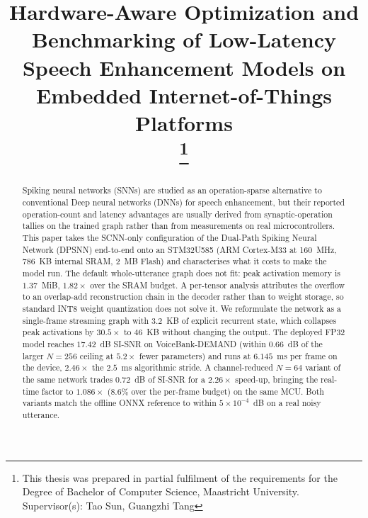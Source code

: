 \documentclass[conference]{IEEEtran}
\begin{document}
\title{Hardware-Aware Optimization and Benchmarking of Low-Latency Speech Enhancement Models on Embedded Internet-of-Things Platforms\\
\thanks{This thesis was prepared in partial fulfilment of the requirements for the Degree of Bachelor of Computer Science, Maastricht University. Supervisor(s): Tao Sun, Guangzhi Tang}
}

\author{
}

\maketitle

\begin{abstract}
Spiking neural networks (SNNs) are studied as an operation-sparse alternative to conventional Deep neural networks (DNNs) for speech enhancement, but their reported operation-count and latency advantages are usually derived from synaptic-operation tallies on the trained graph rather than from measurements on real microcontrollers. This paper takes the SCNN-only configuration of the Dual-Path Spiking Neural Network (DPSNN) end-to-end onto an STM32U585 (ARM Cortex-M33 at 160~MHz, 786~KB internal SRAM, 2~MB Flash) and characterises what it costs to make the model run. The default whole-utterance graph does not fit: peak activation memory is $1.37$~MiB, $1.82\times$ over the SRAM budget. A per-tensor analysis attributes the overflow to an overlap-add reconstruction chain in the decoder rather than to weight storage, so standard INT8 weight quantization does not solve it. We reformulate the network as a single-frame streaming graph with $3.2$~KB of explicit recurrent state, which collapses peak activations by $30.5\times$ to $46$~KB without changing the output. The deployed FP32 model reaches $17.42$~dB SI-SNR on VoiceBank-DEMAND (within $0.66$~dB of the larger $N{=}256$ ceiling at $5.2\times$ fewer parameters) and runs at $6.145$~ms per frame on the device, $2.46\times$ the $2.5$~ms algorithmic stride. A channel-reduced $N{=}64$ variant of the same network trades $0.72$~dB of SI-SNR for a $2.26\times$ speed-up, bringing the real-time factor to $1.086\times$ ($8.6\%$ over the per-frame budget) on the same MCU. Both variants match the offline ONNX reference to within $5 \times 10^{-4}$~dB on a real noisy utterance.
\end{abstract}
\end{document}
